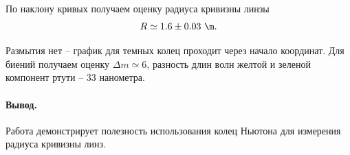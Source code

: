 \documentclass{../lab_class}
\begin{document}
По наклону кривых получаем оценку радиуса кривизны линзы
\begin{gather*}
	R \simeq 1.6 \pm 0.03 \ \m.
\end{gather*}

Размытия нет -- график для темных колец проходит через начало координат. Для биений получаем оценку $\Delta m \simeq 6$, разность длин волн желтой и зеленой компонент ртути -- 33 нанометра.

\paragraph{Вывод.}
Работа демонстрирует полезность использования колец Ньютона для измерения радиуса кривизны линз.
\end{document}
